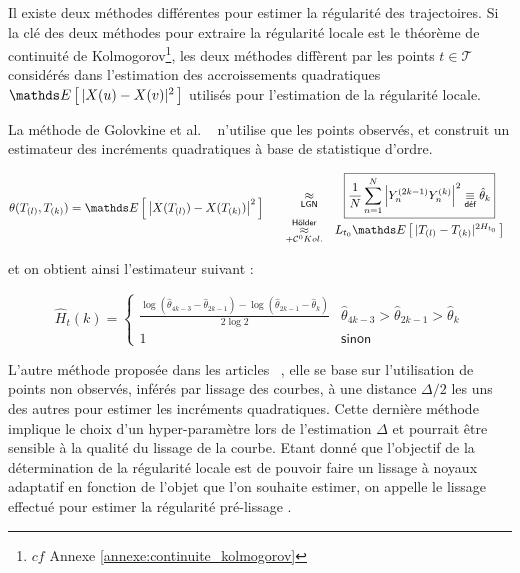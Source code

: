 
Il existe deux méthodes différentes pour estimer la régularité des trajectoires. Si la clé des deux méthodes pour extraire la régularité locale est le théorème de continuité de Kolmogorov\footnote{$cf$ Annexe \ref{annexe:continuite_kolmogorov}}, les deux méthodes diffèrent par les points $t \in \mathcal T$ considérés dans l'estimation des accroissements quadratiques $\esperance{ \vert X(u) - X(v) \vert^2 }$ utilisés pour l'estimation de la régularité locale.

La méthode de Golovkine et al. ~\cite[pages : 7—9]{golovkineRegularityOnlineEstimationNoisyCurve} n'utilise que les points observés, et construit un estimateur des incréments quadratiques à base de statistique d'ordre.

\begin{equation*}
	\theta( T_{(l)}, T_{(k)}) = \esperance{ \left| X( T_{(l)}) - X(T_{(k)}) \right|^2 }  \begin{array}{ccc}
		 & \quad \underset {\textsf{LGN}} \approx
		 & \boxed{\frac 1 {N} \sum\limits_{n=1}^N \left| \statrang Y n {2k-1} \statrang Y n k \right|^2 \isdef \hat \theta_k}
		\\
		 & \, \underset {+ \mathcal C^0 Kol.} {\overset {\textsf{Hölder}} \approx}
		 & L_{t_0} \esperance{| \ordered T l - \ordered T k |^{2H_{t_0}}}
	\end{array}
\end{equation*}

et on obtient ainsi l'estimateur suivant :

\begin{equation*}
	\widehat H_{t}(k) =
	\begin{cases} \displaystyle\frac{\log\left( \hat \theta_{4k-3} - \hat \theta_{2k-1}  \right) - \log \left(  \hat\theta_{2k-1} - \hat \theta_k \right)}{2\log 2}
		 & \hat \theta_{4k-3} > \hat \theta_{2k-1} > \hat \theta_{k}
		\\
		1
		 & \textsf{sinon}
	\end{cases}
\end{equation*}


L'autre méthode proposée dans les articles ~\cite{golovkine2021adaptive,maissoro-SmoothnessFTSweakDep}, elle se base sur l'utilisation de points non observés, inférés par lissage des courbes, à une distance $\Delta / 2$ les uns des autres pour estimer les incréments quadratiques. Cette dernière méthode implique le choix d'un hyper-paramètre lors de l'estimation $\Delta$ et pourrait être sensible à la qualité du lissage de la courbe. Etant donné que l'objectif de la détermination de la régularité locale est de pouvoir faire un lissage à noyaux adaptatif en fonction de l'objet que l'on souhaite estimer, on appelle le lissage effectué pour estimer la régularité \og pré-lissage \fg.


